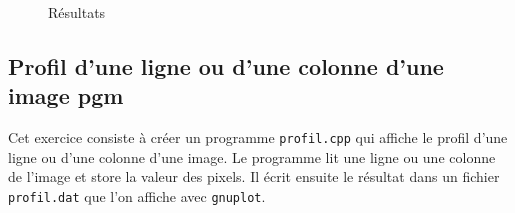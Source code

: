 \documentclass[11pt]{article}
\begin{document}
\begin{figure}[!htb]
  \centering
  \caption{Résultats}
\end{figure}

\FloatBarrier

\clearpage
\subsection{Profil d'une ligne ou d'une colonne d'une image pgm}
Cet exercice consiste à créer un programme \texttt{profil.cpp} qui affiche le profil d'une ligne ou d'une colonne d'une image. Le programme lit une ligne ou une colonne de l'image et store la valeur des pixels. Il écrit ensuite le résultat dans un fichier \texttt{profil.dat} que l'on affiche avec \texttt{gnuplot}.
\end{document}
